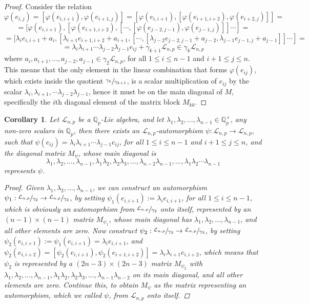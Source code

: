 \documentclass[12pt]{article}
\newtheorem{corollary}[theorem]{Corollary}
\begin{document}
\begin{proof}
Consider the relation \[\varphi(e_{i,j})=[\varphi(e_{i,i+1}),\varphi(e_{i+1,j})]=[\varphi(e_{i,i+1}),[\varphi(e_{i+1,i+2}),\varphi(e_{i+2,j})]]=\]\[=[\varphi(e_{i,i+1}),[\varphi(e_{i+1,i+2}),[\cdots,[\varphi(e_{j-2,j-1}),\varphi(e_{j-1,j})]]\cdots]=\]\[=[\lambda_{i}{e_{i,i+1}}+a_{i},[\lambda_{i+1}{e_{i+1,i+2}}+a_{i+1},[\cdots,[\lambda_{j-2}{e_{j-2,j-1}}+a_{j-2},\lambda_{j-1}e_{j-1,j}+a_{j-1}]]\cdots]=\]\[=\lambda_{i}\lambda_{i+1}\cdots\lambda_{j-2}\lambda_{j-1}e_{ij}+\gamma_{k+1}\mathcal{L}_{n,p}\in\gamma_{k}\mathcal{L}_{n,p}\]
where $a_{i},a_{i+1},\dots,a_{j-2},a_{j-1}\in\gamma_{2}\mathcal{L}_{n,p}$, for all $1\leq{i}\leq{n-1}$ and ${i+1}\leq{j}\leq{n}$. This means that the only element in the linear combination that forms $\varphi(e_{ij})$, which exists inside the quotient $\sfrac{\gamma_{k}}{\gamma_{k+1}}$, is a scalar multiplication of $e_{ij}$ by the scalar $\lambda_{i},\lambda_{i+1},\cdots\lambda_{j-2}\lambda_{j-1}$, hence it must be on the main diagonal of $M$, specifically the $i\mathrm{th}$ diagonal element of the matrix block $M_{kk}$.
\end{proof}
\begin{corollary}
\label{diagonal.automorphism}
Let $\mathcal{L}_{n,p}$ be a $\mathbb{Q}_p$-Lie algebra, and let $\lambda_{1},\lambda_{2},\dots,\lambda_{n-1}\in\mathbb{Q}_{p}^{\times}$, any non-zero scalars in $\mathbb{Q}_{p}$, then there exists an $\mathcal{L}_{n,p}$-automorphism $\psi:{\mathcal{L}_{n,p}}\rightarrow{\mathcal{L}_{n,p}}$, such that $\psi(e_{ij})=\lambda_{i}\lambda_{i+1}\cdots\lambda_{j-1}e_{ij}$, for all $1\leq{i}\leq{n-1}$ and ${i+1}\leq{j}\leq{n}$, and the diagonal matrix $M_{\psi}$, whose main diagonal is
\[\lambda_{1},\lambda_{2},\dots,\lambda_{n-1},\lambda_{1}\lambda_{2},\lambda_{2}\lambda_{3},\dots,\lambda_{n-2}\lambda_{n-1},\dots,\lambda_{1}\lambda_{2}\cdots\lambda_{n-1}\]
represents $\psi$.
\begin{proof}
Given $\lambda_{1},\lambda_{2},\dots,\lambda_{n-1}$, we can construct an automorphism $\psi_{1}:\sfrac{\mathcal{L}_{n,p}}{\gamma_{2}}\rightarrow\sfrac{\mathcal{L}_{n,p}}{\gamma_{2}}$, by setting $\psi_{1}(e_{i,i+1}):=\lambda_{i}e_{i,i+1}$, for all $1\leq{i}\leq{n-1}$, which is obviously an automoprhism from $\sfrac{\mathcal{L}_{n,p}}{\gamma_{2}}$ onto itself, represented by an $(n-1)\times{(n-1)}$ matrix $M_{\psi_{1}}$, whose main diagonal has $\lambda_{1},\lambda_{2},\dots,\lambda_{n-1}$, and all other elements are zero. Now construct $\psi_{2}:\sfrac{\mathcal{L}_{n,p}}{\gamma_{3}}\rightarrow\sfrac{\mathcal{L}_{n,p}}{\gamma_{3}}$, by setting $\psi_{2}(e_{i,i+1}):=\psi_{1}(e_{i,i+1})=\lambda_{i}e_{i,i+1}$, and $\psi_{2}(e_{i,i+2})=[\psi_{2}(e_{i,i+1}),\psi_{2}(e_{i+1,i+2})]=\lambda_{i}\lambda_{i+1}e_{i,i+2}$, which means that $\psi_{2}$ is represented by a $(2n-3)\times(2n-3)$ matrix $M_{\psi_{2}}$ with $\lambda_{1},\lambda_{2},\dots,\lambda_{n-1},\lambda_1\lambda_2,\lambda_2\lambda_3,\dots,\lambda_{n-1}\lambda_{n-2}$ on its main diagonal, and all other elements are zero. Continue this, to obtain $M_{\psi}$ as the matrix representing an automorphism, which we called $\psi$, from $\mathcal{L}_{n,p}$ onto itself.
\end{proof}
\end{corollary}
\end{document}
